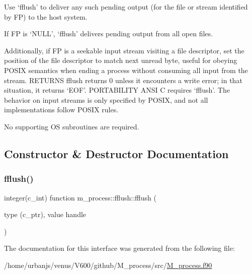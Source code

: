 Use `fflush' to deliver any such pending output (for the file or stream identified by FP) to the host system.

If FP is `N\+U\+LL', `fflush' delivers pending output from all open files.

Additionally, if FP is a seekable input stream visiting a file descriptor, set the position of the file descriptor to match next unread byte, useful for obeying P\+O\+S\+IX semantics when ending a process without consuming all input from the stream. R\+E\+T\+U\+R\+NS fflush returns \textquotesingle{}0\textquotesingle{} unless it encounters a write error; in that situation, it returns `E\+OF'. P\+O\+R\+T\+A\+B\+I\+L\+I\+TY A\+N\+SI C requires `fflush'. The behavior on input streams is only specified by P\+O\+S\+IX, and not all implementations follow P\+O\+S\+IX rules.

No supporting OS subroutines are required. 

\subsection{Constructor \& Destructor Documentation}
\mbox{\label{interfacem__process_1_1fflush_a77d0db933d548b3ee20b064e705a408e}} 
\subsubsection{\texorpdfstring{fflush()}{fflush()}}
{\footnotesize\ttfamily integer(c\+\_\+int) function m\+\_\+process\+::fflush\+::fflush (\begin{DoxyParamCaption}\item[{type (c\+\_\+ptr), value}]{handle }\end{DoxyParamCaption})\hspace{0.3cm}{\ttfamily [private]}}



The documentation for this interface was generated from the following file\+:\begin{DoxyCompactItemize}
\item 
/home/urbanjs/venus/\+V600/github/\+M\+\_\+process/src/\mbox{\hyperlink{M__process_8f90}{M\+\_\+process.\+f90}}\end{DoxyCompactItemize}
